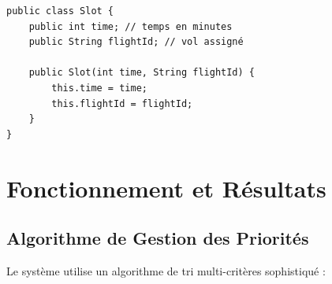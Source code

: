 \documentclass[12pt,a4paper]{article}
\begin{document}
\begin{lstlisting}[caption=Slot.java - Modèle de créneau]
public class Slot {
    public int time; // temps en minutes
    public String flightId; // vol assigné

    public Slot(int time, String flightId) {
        this.time = time;
        this.flightId = flightId;
    }
}
\end{lstlisting}

\section{Fonctionnement et Résultats}

\subsection{Algorithme de Gestion des Priorités}

Le système utilise un algorithme de tri multi-critères sophistiqué :
\end{document}
